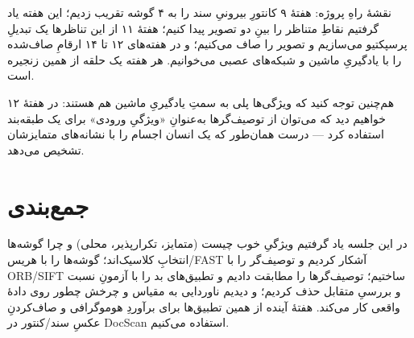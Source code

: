 \documentclass[12pt]{article}
\begin{document}
\begin{yaddasht}
نقشهٔ راهِ پروژه: هفتهٔ ۹ کانتورِ بیرونیِ سند را به ۴ گوشه تقریب زدیم؛ این هفته یاد گرفتیم نقاطِ متناظر را بینِ دو تصویر پیدا کنیم؛ هفتهٔ ۱۱ از این تناظرها یک تبدیلِ پرسپکتیو می‌سازیم و تصویر را صاف می‌کنیم؛ و در هفته‌های ۱۲ تا ۱۴ ارقامِ صاف‌شده را با یادگیریِ ماشین و شبکه‌های عصبی می‌خوانیم. هر هفته یک حلقه از همین زنجیره است.
\end{yaddasht}

هم‌چنین توجه کنید که ویژگی‌ها پلی به سمتِ یادگیریِ ماشین هم هستند: در هفتهٔ ۱۲ خواهیم دید که می‌توان از توصیف‌گرها به‌عنوانِ «ویژگیِ ورودی» برای یک طبقه‌بند استفاده کرد — درست همان‌طور که یک انسان اجسام را با نشانه‌های متمایزشان تشخیص می‌دهد.

\section{جمع‌بندی}

در این جلسه یاد گرفتیم ویژگیِ خوب چیست (متمایز، تکرارپذیر، محلی) و چرا گوشه‌ها انتخابِ کلاسیک‌اند؛ گوشه‌ها را با هریس/FAST آشکار کردیم و توصیف‌گر را با ORB/SIFT ساختیم؛ توصیف‌گرها را مطابقت دادیم و تطبیق‌های بد را با آزمونِ نسبت و بررسیِ متقابل حذف کردیم؛ و دیدیم ناوردایی به مقیاس و چرخش چطور روی دادهٔ واقعی کار می‌کند. هفتهٔ آینده از همین تطبیق‌ها برای برآوردِ هوموگرافی و صاف‌کردنِ عکسِ سند/کنتور در DocScan استفاده می‌کنیم.
\end{document}
